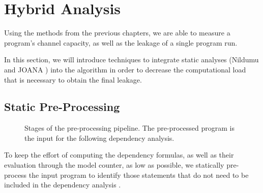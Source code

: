 \chapter{Hybrid Analysis}

Using the methods from the previous chapters, we are able to measure a program's channel capacity, as well as the leakage of a single program run.

In this section, we will introduce techniques to integrate static analyses (Nildumu \cite{bechberger18} and JOANA \cite{hammer09}) into the algorithm in order to decrease the computational load that is necessary to obtain the final leakage.

\section{Static Pre-Processing}\label{sec:pre}
\begin{figure}
    \centering
    \caption{Stages of the pre-processing pipeline. The pre-processed program is the input for the following dependency analysis.}
    \label{fig:pp}
\end{figure}

To keep the effort of computing the dependency formulas, as well as their evaluation through the model counter, as low as possible, we statically pre-process the input program to identify those statements that do not need to be included in the dependency analysis .

